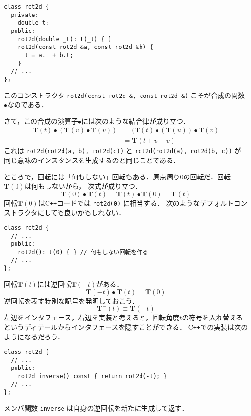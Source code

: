 \documentclass{jsbook}
\newcommand{\cxx}{\textrm{C}\texttt{++}}
\newcommand{\ccode}[1]{\texttt{#1}}
\newcommand{\bop}[1]{\boldsymbol{#1}}
\begin{document}
\begin{verbatim}
class rot2d {
  private:
    double t;
  public:
    rot2d(double _t): t(_t) { }
    rot2d(const rot2d &a, const rot2d &b) {
      t = a.t + b.t;
    }
  // ...
};
\end{verbatim}

このコンストラクタ \ccode{rot2d(const rot2d \&, const rot2d \&)} こそが合成の関数$\bullet$なのである．

さて，この合成の演算子$\bullet$には次のような結合律が成り立つ．
\begin{align}
\bop{T}(t)\bullet(\bop{T}(u)\bullet\bop{T}(v))&=(\bop{T}(t)\bullet(\bop{T}(u))\bullet\bop{T}(v)\\
  &=\bop{T}(t+u+v)
\end{align}
これは \ccode{rot2d(rot2d(a, b), rot2d(c))} と \ccode{rot2d(rot2d(a), rot2d(b, c))} が
同じ意味のインスタンスを生成するのと同じことである．

ところで，回転には「何もしない」回転もある．原点周り$0$の回転だ．回転$\bop{T}(0)$は何もしないから，
次式が成り立つ．
\begin{equation}
\bop{T}(0)\bullet\bop{T}(t)=\bop{T}(t)\bullet\bop{T}(0)=\bop{T}(t)
\end{equation}
回転$\bop{T}(0)$は\cxx コードでは \ccode{rot2d(0)} に相当する．
次のようなデフォルトコンストラクタにしても良いかもしれない．

\begin{verbatim}
class rot2d {
  // ...
  public:
    rot2d(): t(0) { } // 何もしない回転を作る
  // ...
};
\end{verbatim}

回転$\bop{T}(t)$には逆回転$\bop{T}(-t)$がある．
\begin{equation}
\bop{T}(-t)\bullet\bop{T}(t)=\bop{T}(0)
\end{equation}
逆回転を表す特別な記号を発明しておこう．
\begin{equation}
\bop{T}^{-}(t)\equiv\bop{T}(-t)
\end{equation}
左辺をインタフェース，右辺を実装と考えると，回転角度$t$の符号を入れ替えるというディテールからインタフェースを隠すことができる．
\cxx での実装は次のようになるだろう．

\begin{verbatim}
class rot2d {
  // ...
  public:
    rot2d inverse() const { return rot2d(-t); }
  // ...
};
\end{verbatim}

メンバ関数 \ccode{inverse} は自身の逆回転を新たに生成して返す．
\end{document}
